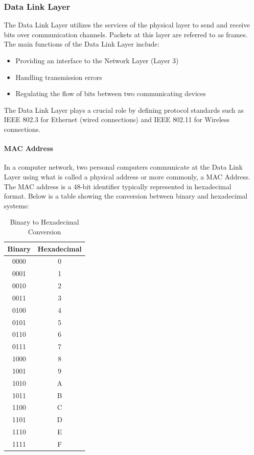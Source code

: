 \subsubsection{\textbf{Data Link Layer}}
The Data Link Layer utilizes the services of the physical layer to send and receive bits over communication channels. Packets at this layer are referred to as frames. The main functions of the Data Link Layer include:

\begin{itemize}
    \item Providing an interface to the Network Layer (Layer 3)
    \item Handling transmission errors
    \item Regulating the flow of bits between two communicating devices
\end{itemize}

The Data Link Layer plays a crucial role by defining protocol standards such as IEEE 802.3 for Ethernet (wired connections) and IEEE 802.11 for Wireless connections.

\paragraph{MAC Address}
In a computer network, two personal computers communicate at the Data Link Layer using what is called a physical address or more commonly, a MAC Address. The MAC address is a 48-bit identifier typically represented in hexadecimal format. Below is a table showing the conversion between binary and hexadecimal systems:

\begin{table}[h]
    \centering
    \begin{tabular}{|c|c|}
        \hline
        \textbf{Binary} & \textbf{Hexadecimal} \\
        \hline
        0000 & 0 \\
        0001 & 1 \\
        0010 & 2 \\
        0011 & 3 \\
        0100 & 4 \\
        0101 & 5 \\
        0110 & 6 \\
        0111 & 7 \\
        1000 & 8 \\
        1001 & 9 \\
        1010 & A \\
        1011 & B \\
        1100 & C \\
        1101 & D \\
        1110 & E \\
        1111 & F \\
        \hline
    \end{tabular}
    \caption{Binary to Hexadecimal Conversion}
    \label{tab:bin_hex}
\end{table}

